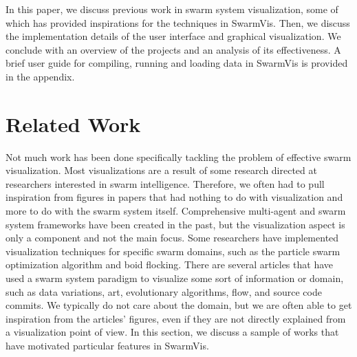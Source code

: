 \documentclass[conference]{IEEEtran}
\begin{document}
In this paper, we discuss previous work in swarm system visualization,
some of which has provided inspirations for the techniques in SwarmVis.
Then, we discuss the implementation details of the user interface and graphical visualization.
We conclude with an overview of the projects and an analysis of its effectiveness.
A brief user guide for compiling, running and loading data in SwarmVis is provided in the appendix.

\section{Related Work}
Not much work has been done specifically tackling the problem of effective swarm visualization. Most visualizations are
a result of some research directed at researchers interested in swarm intelligence. Therefore, we often had to pull inspiration
from figures in papers that had nothing to do with visualization and more to do with the swarm system itself.
Comprehensive multi-agent and swarm system frameworks \cite{Luke}\cite{860347} have been created in the past,
but the visualization aspect is only a component and not the main focus. Some researchers have implemented
visualization techniques for specific swarm domains, such as the particle swarm optimization algorithm\cite{Secrest} and 
boid flocking\cite{reynolds1987}.
There are several articles that have used a swarm system paradigm to visualize some sort of information or domain, such as 
data variations\cite{1382896}, art\cite{Boyd}, evolutionary algorithms\cite{spector2005ecb}\cite{Spector02evolutionarydynamics},
flow\cite{10.1109/TVCG.2005.87}\cite{Merzkirch}, and source code commits\cite{codeswarm:website}.
We typically do not care about the domain, but we are often able to get inspiration from the articles' figures, even if they are 
not directly explained from a visualization point of view.
In this section, we discuss a sample of works that have motivated particular features in SwarmVis.
\end{document}
